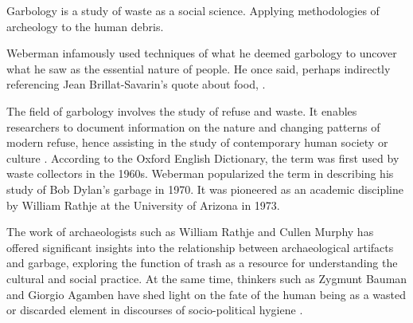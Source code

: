 




%
%
Garbology is a study of waste as a social science. Applying methodologies of archeology to the human debris. 

Weberman infamously used techniques of what he deemed garbology to uncover what he saw as the essential nature of people. He once said, perhaps indirectly referencing Jean Brillat-Savarin’s quote about food,  \citep{lukas2012garbage}.

The field of garbology involves the study of refuse and waste. It enables researchers to document information on the nature and changing patterns of modern refuse, hence assisting in the study of contemporary human society or culture \citep{roy2012garbology}. According to the Oxford English Dictionary, the term was first used by waste collectors in the 1960s. Weberman popularized the term in describing his study of Bob Dylan’s garbage in 1970. It was pioneered as an academic discipline by William Rathje at the University of Arizona in 1973.

The work of archaeologists such as William Rathje and Cullen Murphy has offered significant insights into the relationship between archaeological artifacts and garbage, exploring the function of trash as a resource for understanding the cultural and social practice. At the same time, thinkers such as Zygmunt Bauman and Giorgio Agamben have shed light on the fate of the human being as a wasted or discarded element in discourses of socio-political hygiene \citep{pye2010trashculture}. 

